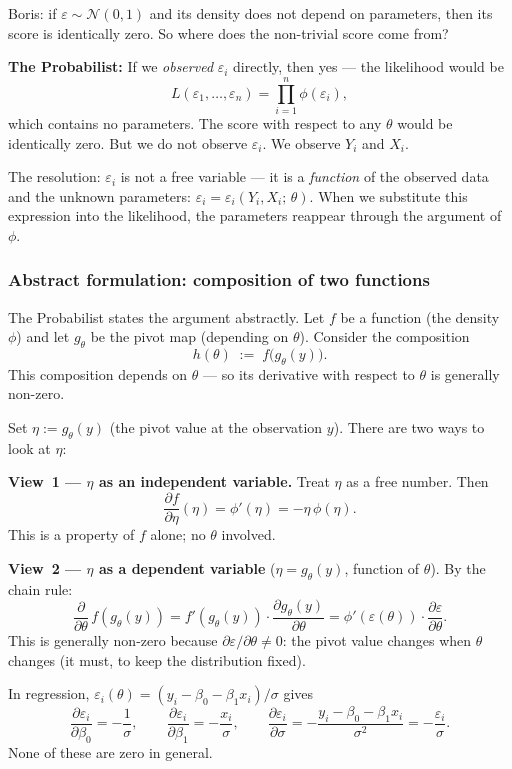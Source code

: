 \documentclass[a4paper,oneside,12pt]{extarticle}
\theoremstyle{plain}
\theoremstyle{definition}
\theoremstyle{remark}
\begin{document}
Boris: if $\varepsilon \sim \mathcal{N}(0,1)$ and its density does
not depend on parameters, then its score is identically zero.  So
where does the non-trivial score come from?

\textbf{The Probabilist:} If we \emph{observed} $\varepsilon_i$ directly, then
yes --- the likelihood would be
\[
  L(\varepsilon_1,\ldots,\varepsilon_n)
  = \prod_{i=1}^n \phi(\varepsilon_i),
\]
which contains no parameters.  The score with respect to any
$\theta$ would be identically zero.  But we do not observe
$\varepsilon_i$.  We observe $Y_i$ and $X_i$.

The resolution: $\varepsilon_i$ is not a free variable --- it is a
\emph{function} of the observed data and the unknown parameters:
$\varepsilon_i = \varepsilon_i(Y_i, X_i;\,\theta)$.  When we
substitute this expression into the likelihood, the parameters
reappear through the argument of $\phi$.

\subsubsection*{Abstract formulation: composition of two functions}

The Probabilist states the argument abstractly.  Let $f$ be a function (the
density $\phi$) and let $g_\theta$ be the pivot map (depending on
$\theta$).  Consider the composition
\[
  h(\theta) \;:=\; f\!\bigl(g_\theta(y)\bigr).
\]
This composition depends on $\theta$ --- so its derivative with
respect to $\theta$ is generally non-zero.

Set $\eta := g_\theta(y)$ (the pivot value at the observation $y$).
There are two ways to look at $\eta$:

\textbf{View~1 --- $\eta$ as an independent variable.}  Treat
$\eta$ as a free number.  Then
\[
  \frac{\partial f}{\partial \eta}(\eta) = \phi'(\eta) = -\eta\,\phi(\eta).
\]
This is a property of $f$ alone; no $\theta$ involved.

\textbf{View~2 --- $\eta$ as a dependent variable} ($\eta =
g_\theta(y)$, function of $\theta$).  By the chain rule:
\[
  \frac{\partial}{\partial\theta}\,f(g_\theta(y))
  = f'(g_\theta(y))\cdot \frac{\partial g_\theta(y)}{\partial\theta}
  = \phi'(\varepsilon(\theta))\cdot\frac{\partial\varepsilon}{\partial\theta}.
\]
This is generally non-zero because $\partial\varepsilon/\partial\theta
\neq 0$: the pivot value changes when $\theta$ changes (it must, to
keep the distribution fixed).

In regression, $\varepsilon_i(\theta) = (y_i - \beta_0 -
\beta_1 x_i)/\sigma$ gives
\[
  \frac{\partial\varepsilon_i}{\partial\beta_0} = -\frac{1}{\sigma},
  \qquad
  \frac{\partial\varepsilon_i}{\partial\beta_1} = -\frac{x_i}{\sigma},
  \qquad
  \frac{\partial\varepsilon_i}{\partial\sigma}
  = -\frac{y_i - \beta_0 - \beta_1 x_i}{\sigma^2}
  = -\frac{\varepsilon_i}{\sigma}.
\]
None of these are zero in general.
\end{document}
